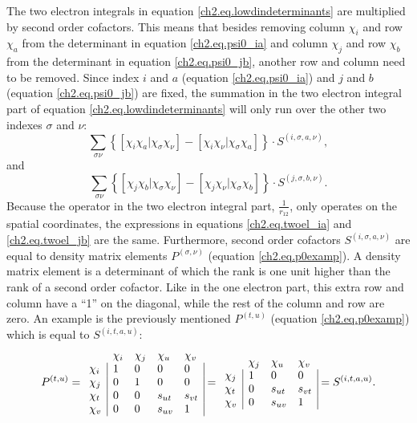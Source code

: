 The two electron integrals in equation \ref{ch2.eq.lowdindeterminants} are multiplied by second order cofactors. This means that besides removing column $\chi_i$ and row $\chi_a$ from the determinant in equation \ref{ch2.eq.psi0_ia} and column $\chi_j$ and row $\chi_b$ from the determinant in equation \ref{ch2.eq.psi0_jb}, another row and column need to be removed. Since index $i$ and $a$ (equation \ref{ch2.eq.psi0_ia}) and $j$ and $b$ (equation \ref{ch2.eq.psi0_jb}) are fixed, the summation in the two electron integral part of equation \ref{ch2.eq.lowdindeterminants} will only run over the other two indexes $\sigma$ and $\nu$:
\begin{equation}
\sum_{\sigma\nu} \left\{ [\chi_i\chi_a|\chi_\sigma\chi_\nu] - [\chi_i\chi_\nu|\chi_\sigma\chi_a] \right\} \cdot S^{(i,\sigma,a,\nu)},
\label{ch2.eq.twoel_ia}
\end{equation}
and
\begin{equation}
\sum_{\sigma\nu} \left\{ [\chi_j\chi_b|\chi_\sigma\chi_\nu] - [\chi_j\chi_\nu|\chi_\sigma\chi_b] \right\} \cdot S^{(j,\sigma,b,\nu)}.
\label{ch2.eq.twoel_jb}
\end{equation}
Because the operator in the two electron integral part, $\frac{1}{r_{12}}$, only operates on the spatial coordinates, the expressions in equations \ref{ch2.eq.twoel_ia} and \ref{ch2.eq.twoel_jb} are the same. Furthermore, second order cofactors $S^{(i,\sigma,a,\nu)}$ are equal to density matrix elements $P^{(\sigma,\nu)}$ (equation \ref{ch2.eq.p0examp}). A density matrix element is a determinant of which the rank is one unit higher than the rank of a second order cofactor. Like in the one electron part, this extra row and column have a ``1'' on the diagonal, while the rest of the column and row are zero. An example is the previously mentioned $P^{(t,u)}$ (equation \ref{ch2.eq.p0examp}) which is equal to $S^{(i,t,a,u)}$:
\begin{equation}
P^{(t,u)}=
\begin{array}{lllll}
 &  \chi_i & \chi_j & \chi_u & \chi_v \\
 \chi_i & \multicolumn{1}{|l}{ 1 } & 0 & 0 & \multicolumn{1}{l|}{ 0 } \\
 \chi_j & \multicolumn{1}{|l}{ 0 } & 1 & 0 & \multicolumn{1}{l|}{ 0 } \\
 \chi_t & \multicolumn{1}{|l}{ 0 } & 0 & s_{ut} & \multicolumn{1}{l|}{s_{vt}} \\
 \chi_v & \multicolumn{1}{|l}{ 0 } & 0 & s_{uv} & \multicolumn{1}{l|}{1}
\end{array}=
\begin{array}{llll}
 & \chi_j & \chi_u & \chi_v \\
 \chi_j & \multicolumn{1}{|l}{ 1 } & 0 & \multicolumn{1}{l|}{ 0 } \\
 \chi_t & \multicolumn{1}{|l}{ 0 } & s_{ut} & \multicolumn{1}{l|}{s_{vt}} \\
 \chi_v & \multicolumn{1}{|l}{ 0 } & s_{uv} & \multicolumn{1}{l|}{1}
\end{array}=S^{(i,t,a,u)}.
\end{equation}
